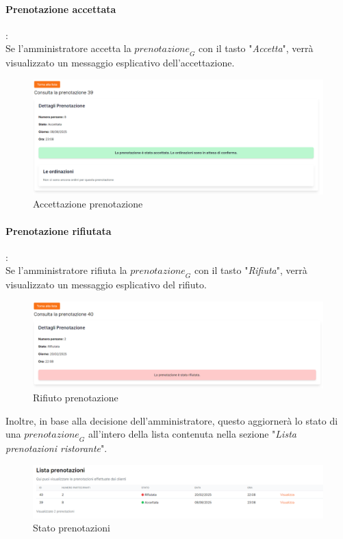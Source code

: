 \paragraph{Prenotazione accettata}: \\
Se l'amministratore accetta la $\textit{prenotazione}_G$ con il tasto "\emph{Accetta}", verrà visualizzato un messaggio esplicativo dell'accettazione.
\begin{figure}[H]
    \centering
    \includegraphics[width=0.75\linewidth]{img/accettazione_prenotazione.PNG}
    \caption{Accettazione prenotazione}
    \label{fig:Accettazione prenotazione}
\end{figure}

\paragraph{Prenotazione rifiutata}: \\
Se l'amministratore rifiuta la $\textit{prenotazione}_G$ con il tasto "\emph{Rifiuta}", verrà visualizzato un messaggio esplicativo del rifiuto.
\begin{figure}[H]
    \centering
    \includegraphics[width=0.75\linewidth]{img/rifiuto_prenotazione.PNG}
    \caption{Rifiuto prenotazione}
    \label{fig:Rifiuto prenotazione}
\end{figure}
Inoltre, in base alla decisione dell'amministratore, questo aggiornerà lo stato di una $\textit{prenotazione}_G$ all'intero della lista contenuta nella sezione "\emph{Lista prenotazioni ristorante}".
\begin{figure}[H]
    \centering
    \includegraphics[width=0.85\linewidth]{img/stati_prenotazione.PNG}
    \caption{Stato prenotazioni}
    \label{fig:Stato prenotazioni}
\end{figure}

